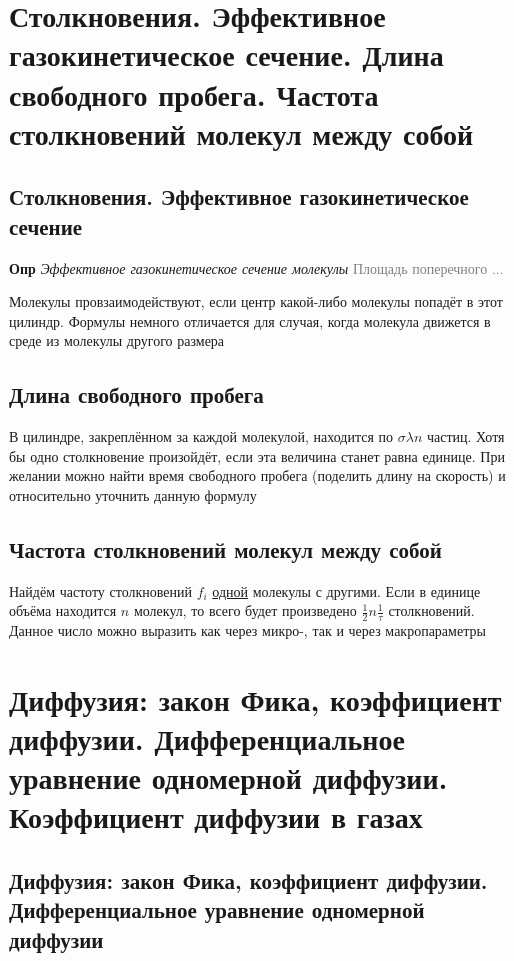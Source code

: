 \documentclass[a4paper, 14pt]{article}
\begin{document}
    \section{Столкновения. Эффективное газокинетическое сечение.
    Длина свободного пробега.
    Частота столкновений молекул между собой}
    
    \subsection{Столкновения. Эффективное газокинетическое сечение}
    
    \textbf{Опр} \textit{Эффективное газокинетическое сечение молекулы} \textcolor{gray}{Площадь поперечного ...}
    
    Молекулы провзаимодействуют, если центр какой-либо молекулы попадёт в этот цилиндр.
    Формулы немного отличается для случая, когда молекула движется в среде из молекулы другого размера
    
    \subsection{Длина свободного пробега}
    
    В цилиндре, закреплённом за каждой молекулой, находится по $\sigma \lambda n$ частиц.
    Хотя бы одно столкновение произойдёт, если эта величина станет равна единице.
    При желании можно найти время свободного пробега (поделить длину на скорость) и относительно уточнить данную формулу
    
    \subsection{Частота столкновений молекул между собой}
    
    Найдём частоту столкновений $f_i$ \underline{одной} молекулы с другими.
    Если в единице объёма находится $n$ молекул, то всего будет произведено $\frac{1}{2}n \frac{1}{\tau}$ столкновений.
    Данное число можно выразить как через микро-, так и через макропараметры
    
    \section{Диффузия: закон Фика, коэффициент диффузии. Дифференциальное уравнение одномерной диффузии.
    Коэффициент диффузии в газах}
    
    \subsection{Диффузия: закон Фика, коэффициент диффузии. Дифференциальное уравнение одномерной диффузии}
    
\end{document}
